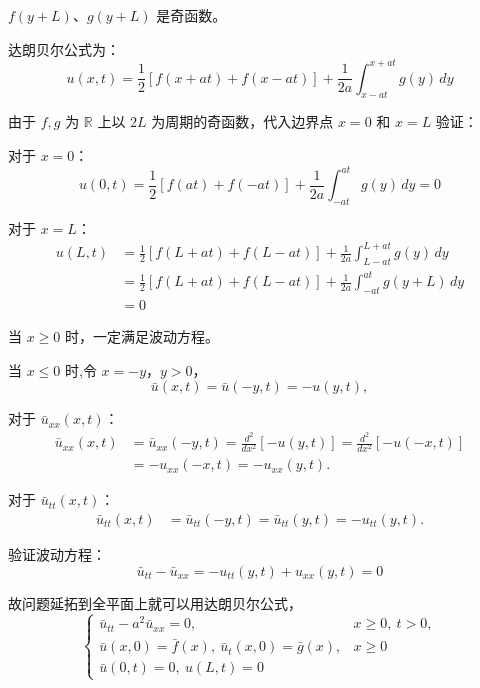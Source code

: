 \documentclass[a4paper, 12pt, oneside]{article} %
\numberwithin{subsection}{section}
\numberwithin{subsubsection}{subsection}
\theoremstyle{plain}
\theoremstyle{definition}
\theoremstyle{remark}
\begin{document}
		$f(y + L)$、$g(y + L)$ 是奇函数。
		
		
		
		达朗贝尔公式为：
		\begin{equation}
			u(x,t) = \frac{1}{2} \left[ f(x + at) + f(x - at) \right] + \frac{1}{2a} \int_{x - at}^{x + at} g(y) \, dy
		\end{equation}
		
		由于 \(f, g\) 为 \(\mathbb{R}\) 上以 \(2L\) 为周期的奇函数，代入边界点 \(x = 0\) 和 \(x = L\) 验证：
		
		对于 \(x = 0\)：
		\begin{equation}
			u(0, t) = \frac{1}{2} \left[ f(at) + f(-at) \right] + \frac{1}{2a} \int_{-at}^{at} g(y) \, dy = 0
		\end{equation}
		
		对于 \(x = L\)：
		\begin{equation}
			\begin{aligned}
				u(L, t) &= \frac{1}{2}[f(L + at) + f(L - at)] + \frac{1}{2a} \int_{L - at}^{L + at} g(y) \, dy \\
				&= \frac{1}{2}[f(L + at) + f(L - at)] + \frac{1}{2a} \int_{-at}^{at} g(y + L) \, dy \\
				&= 0
			\end{aligned}
		\end{equation}
		
		当 \(x \geq 0\) 时，一定满足波动方程。
		
		当 \(x \leq 0\) 时,令 \(x = -y\)，\(y > 0\)，
		\[
		\bar{u}(x, t) = \bar{u}(-y, t) = -u(y, t),
		\]
		
		对于 \(\bar{u}_{xx}(x, t)\)：
		\[
		\begin{aligned}
			\bar{u}_{xx}(x, t) &= \bar{u}_{xx}(-y, t) = \frac{d^2}{dx^2} [-u(y, t)] = \frac{d^2}{dx^2} [-u(-x, t)] \\
			&= -u_{xx}(-x, t) = -u_{xx}(y, t).
		\end{aligned}
		\]
		
		对于 \(\bar{u}_{tt}(x, t)\)：
		\[
		\begin{aligned}
			\bar{u}_{tt}(x, t) &= \bar{u}_{tt}(-y, t) = \bar{u}_{tt}(y, t) = -u_{tt}(y, t).
		\end{aligned}
		\]
		
		验证波动方程：
		\[
		\bar{u}_{tt} - \bar{u}_{xx} = -u_{tt}(y, t) + u_{xx}(y, t) = 0
		\]
		
		故问题延拓到全平面上就可以用达朗贝尔公式，
		\begin{equation*}
			\begin{cases}
				\bar{u}_{tt} - a^2 \bar{u}_{xx} = 0, & x \geq  0 , \ t > 0, \\
				\bar{u}(x, 0) = \bar{f}(x), \ \bar{u}_t(x, 0) = \bar{g}(x), & x \geq  0 \\
				\bar{u}(0, t) = 0, \ u(L, t) = 0
			\end{cases}
		\end{equation*}
		
\end{document}
